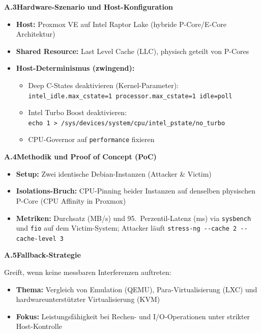 \documentclass[conference]{IEEEtran}
\begin{document}
\bigskip
\noindent\textbf{A.3\quad Hardware-Szenario und Host-Konfiguration}

\begin{itemize}
  \item \textbf{Host:} Proxmox VE auf Intel Raptor Lake
        (hybride P-Core/E-Core Architektur)
  \item \textbf{Shared Resource:} Last Level Cache (LLC),
        physisch geteilt von P-Cores
  \item \textbf{Host-Determinismus (zwingend):}
    \begin{itemize}
      \item Deep C-States deaktivieren (Kernel-Parameter):\\
            \texttt{intel\_idle.max\_cstate=1
            processor.max\_cstate=1 idle=poll}
      \item Intel Turbo Boost deaktivieren:\\
            \texttt{echo 1 >\
            /sys/devices/system/cpu/intel\_pstate/no\_turbo}
      \item CPU-Governor auf \texttt{performance} fixieren
    \end{itemize}
\end{itemize}

\bigskip
\noindent\textbf{A.4\quad Methodik und Proof of Concept (PoC)}

\begin{itemize}
  \item \textbf{Setup:} Zwei identische Debian-Instanzen
        (Attacker \& Victim)
  \item \textbf{Isolations-Bruch:} CPU-Pinning beider Instanzen auf
        denselben physischen P-Core (CPU Affinity in Proxmox)
  \item \textbf{Metriken:} Durchsatz (MB/s) und 95.~Perzentil-Latenz (ms)
        via \texttt{sysbench} und \texttt{fio} auf dem Victim-System;
        Attacker läuft \texttt{stress-ng {-}{-}cache 2
        {-}{-}cache-level 3}
\end{itemize}

\bigskip
\noindent\textbf{A.5\quad Fallback-Strategie}

Greift, wenn keine messbaren Interferenzen auftreten:

\begin{itemize}
  \item \textbf{Thema:} Vergleich von Emulation (QEMU),
        Para-Virtualisierung (LXC) und hardwareunterstützter
        Virtualisierung (KVM)
  \item \textbf{Fokus:} Leistungsfähigkeit bei Rechen- und
        I/O-Operationen unter strikter Host-Kontrolle
\end{itemize}
\end{document}
